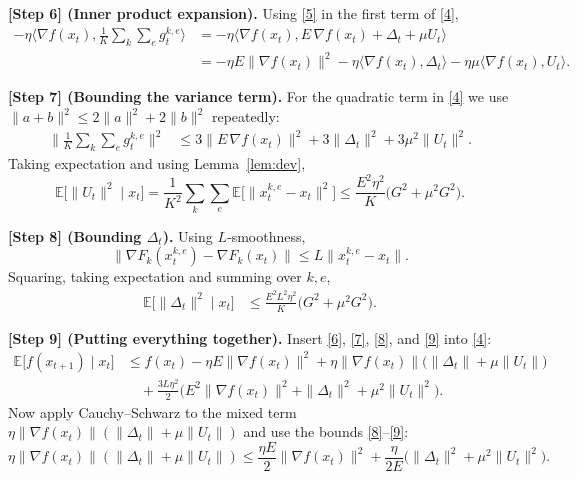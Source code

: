 \documentclass[11pt]{article}
\begin{document}
\noindent\textbf{[Step 6] (Inner product expansion).}  
Using \eqref{5} in the first term of \eqref{4},
\begin{align}
-\eta\Big\langle\nabla f(x_t),\frac1K\!\sum_{k}\!\sum_{e}
      g^{k,e}_t\Big\rangle
&= -\eta\Big\langle\nabla f(x_t),E\,\nabla f(x_t)+\Delta_t+\mu U_t\Big\rangle\\
&= -\eta E\|\nabla f(x_t)\|^{2}
   -\eta\langle\nabla f(x_t),\Delta_t\rangle
   -\eta\mu\langle\nabla f(x_t),U_t\rangle .
\tag{6}
\end{align}

\noindent\textbf{[Step 7] (Bounding the variance term).}  
For the quadratic term in \eqref{4} we use
$\|a+b\|^{2}\le 2\|a\|^{2}+2\|b\|^{2}$ repeatedly:
\begin{align}
\Big\|\frac1K\sum_{k}\sum_{e} g^{k,e}_t\Big\|^{2}
&\le 3\Big\|E\,\nabla f(x_t)\Big\|^{2}
   +3\|\Delta_t\|^{2}
   +3\mu^{2}\|U_t\|^{2}.
\tag{7}
\end{align}
Taking expectation and using Lemma~\ref{lem:dev},
\[
\mathbb{E}\big[\|U_t\|^{2}\mid x_t\big]
   =\frac1{K^{2}}\sum_{k}\sum_{e}
     \mathbb{E}\!\big[\|x^{k,e}_t-x_t\|^{2}\big]
   \le \frac{E^{2}\eta^{2}}{K}\big(G^{2}+\mu^{2}G^{2}\big).
\tag{8}
\]

\noindent\textbf{[Step 8] (Bounding $\Delta_t$).}  
Using $L$‑smoothness,
\[
\|\nabla F_k(x^{k,e}_t)-\nabla F_k(x_t)\|
\le L\|x^{k,e}_t-x_t\|.
\]
Squaring, taking expectation and summing over $k,e$,
\begin{align}
\mathbb{E}\big[\|\Delta_t\|^{2}\mid x_t\big]
&\le \frac{E^{2}L^{2}\eta^{2}}{K}
   \big(G^{2}+\mu^{2}G^{2}\big).
\tag{9}
\end{align}

\noindent\textbf{[Step 9] (Putting everything together).}  
Insert \eqref{6}, \eqref{7}, \eqref{8}, and \eqref{9} into \eqref{4}:
\begin{align}
\mathbb{E}\!\big[f(x_{t+1})\mid x_t\big]
&\le f(x_t)
   -\eta E\|\nabla f(x_t)\|^{2}
   +\eta\|\nabla f(x_t)\|\big(\|\Delta_t\|+\mu\|U_t\|\big) \nonumber\\
&\quad +\frac{3L\eta^{2}}{2}
   \Big(E^{2}\|\nabla f(x_t)\|^{2}
        +\|\Delta_t\|^{2}
        +\mu^{2}\|U_t\|^{2}\Big).
\tag{10}
\end{align}
Now apply Cauchy–Schwarz to the mixed term
$\eta\|\nabla f(x_t)\|(\|\Delta_t\|+\mu\|U_t\|)$ and use the bounds
\eqref{8}–\eqref{9}:
\[
\eta\|\nabla f(x_t)\|(\|\Delta_t\|+\mu\|U_t\|)
\le
\frac{\eta E}{2}\|\nabla f(x_t)\|^{2}
   +\frac{\eta}{2E}\big(\|\Delta_t\|^{2}+\mu^{2}\|U_t\|^{2}\big).
\tag{11}
\]
\end{document}
